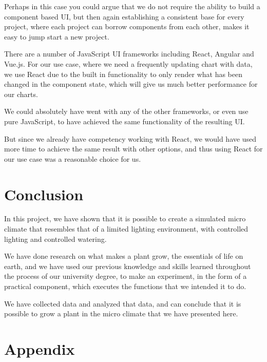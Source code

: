 \documentclass[a4paper,12pt,twoside,openright,titlepage]{book}
\begin{document}
Perhaps in this case you could argue that we do not require the ability to build a component based UI, but then again establishing a consistent base for every project, where each project can borrow components from each other, makes it easy to jump start a new project.

There are a number of JavaScript UI frameworks including React, Angular and Vue.js.
For our use case, where we need a frequently updating chart with data, we use React due to the built in functionality to only render what has been changed in the component state, which will give us much better performance for our charts.

We could absolutely have went with any of the other frameworks, or even use pure JavaScript, to have achieved the same functionality of the resulting UI.

But since we already have competency working with React, we would have used more time to achieve the same result with other options, and thus using React for our use case was a reasonable choice for us.

\chapter{Conclusion}
In this project, we have shown that it is possible to create a simulated micro climate that resembles that of a limited lighting environment, with controlled lighting and controlled watering.

We have done research on what makes a plant grow, the essentials of life on earth, and we have used our previous knowledge and skills learned throughout the process of our university degree, to make an experiment, in the form of a practical component, which executes the functions that we intended it to do.

We have collected data and analyzed that data, and can conclude that it is possible to grow a plant in the micro climate that we have presented here.

\appendix
\cleardoublepage{}
\chapter{Appendix}
\backmatter
\cleardoublepage{}


\end{document}
